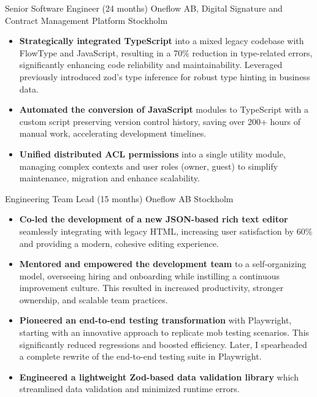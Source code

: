 {Senior Software Engineer (24 months)}
{Oneflow AB,  Digital Signature and Contract Management Platform}
{Stockholm \Large{}}{}
{
  \begin{itemize}[itemsep=0.07pt, topsep=0.5pt]
    \item \textbf{Strategically integrated TypeScript} into a mixed legacy codebase with FlowType and JavaScript, resulting in a 70\% reduction in type-related errors, significantly enhancing code reliability and maintainability.
    Leveraged previously introduced zod's type inference for robust type hinting in business data.
    \item \textbf{Automated the conversion of JavaScript} modules to TypeScript with a custom script preserving version control history, saving over 200+ hours of manual work, accelerating development timelines.
    \item \textbf{Unified distributed ACL permissions} into a single utility module, managing complex contexts and user roles (owner, guest) to simplify maintenance, migration and enhance scalability.
   \end{itemize}
}
{Engineering Team Lead (15 months)}
{Oneflow AB}
{Stockholm \Large{}}{}
{
  \begin{itemize}[itemsep=0.07pt, topsep=0.5pt]
    \item \textbf{Co-led the development of a new JSON-based rich text editor} seamlessly integrating with legacy HTML, increasing user satisfaction by 60\% and providing a modern, cohesive editing experience.
    \item \textbf{Mentored and empowered the development team} to a self-organizing model, overseeing hiring and onboarding while instilling a continuous improvement culture. This resulted in increased productivity, stronger ownership, and scalable team practices.
    \item \textbf{Pioneered an end-to-end testing transformation} with Playwright, starting with an innovative approach to replicate mob testing scenarios. This significantly reduced regressions and boosted efficiency.
    Later, I spearheaded a complete rewrite of the end-to-end testing suite in Playwright.
    \item \textbf{Engineered a lightweight Zod-based data validation library} which streamlined data validation and minimized runtime errors.
  \end{itemize}
}
